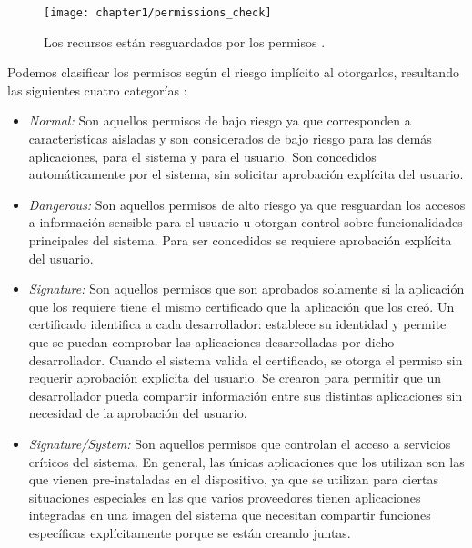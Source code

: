\begin{figure}[hbtp]
	\begin{center}
		\texttt{[image: chapter1/permissions\_check]}
		\caption{Los recursos están resguardados por los permisos \cite{aossec}.}
		\label{fig:ch01:permissions-check}
	\end{center}
\end{figure}
Podemos clasificar los permisos según el riesgo implícito al otorgarlos, resultando las siguientes cuatro categorías \cite{Rom14}:
\begin{itemize}
    \item \emph{Normal:} Son aquellos permisos de bajo riesgo ya que corresponden a características aisladas y son considerados de bajo riesgo para las demás aplicaciones, para el sistema y para el usuario. Son concedidos automáticamente por el sistema, sin solicitar aprobación explícita del usuario.
    \item \emph{Dangerous:} Son aquellos permisos de alto riesgo ya que resguardan los accesos a información sensible para el usuario u otorgan control sobre funcionalidades principales del sistema. Para ser concedidos se requiere aprobación explícita del usuario. 
    \item \emph{Signature:} Son aquellos permisos que son aprobados solamente si la aplicación que los requiere tiene el mismo certificado que la aplicación que los creó. Un certificado identifica a cada desarrollador: establece su identidad y permite que se puedan comprobar las aplicaciones desarrolladas por dicho desarrollador. Cuando el sistema valida el certificado, se otorga el permiso sin requerir aprobación explícita del usuario. Se crearon para permitir que un desarrollador pueda compartir información entre sus distintas aplicaciones sin necesidad de la aprobación del usuario.
    \item \emph{Signature/System:} Son aquellos permisos que controlan el acceso a servicios críticos del sistema. En general, las únicas aplicaciones que los utilizan son las que vienen pre-instaladas en el dispositivo, ya que se utilizan para ciertas situaciones especiales en las que varios proveedores tienen aplicaciones integradas en una imagen del sistema que necesitan compartir funciones específicas explícitamente porque se están creando juntas.
\end{itemize}
